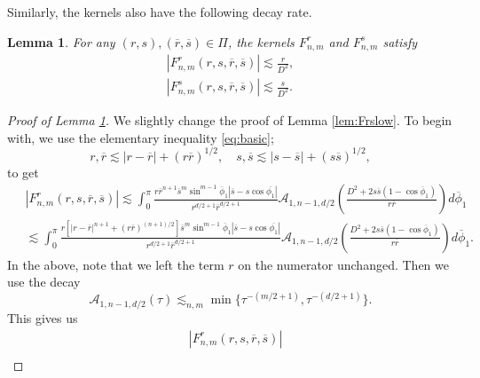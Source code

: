\documentclass[11pt]{amsart}
\newtheorem{lem}[theorem]{Lemma}
\theoremstyle{definition}
\theoremstyle{remark}
\numberwithin{equation}{section}
\numberwithin{equation}{section}
\newcommand{\br}[1]{\overline{#1}}
\newcommand{\0}{\emptyset}
\newcommand{\calA}{\mathcal A}
\begin{document}
	Similarly, the kernels also have the following decay rate.
	\begin{lem}\label{lem:FrFsweight}
		For any $(r,s), (\br{r},\br{s})\in \Pi$, the kernels $F_{n,m}^{r}$ and $F_{n,m}^{s}$ satisfy
		\begin{align}
			|F_{n,m}^{r}(r,s,\br{r},\br{s})|\lesssim \frac{r}{D^{2}},\label{eq:Frweight}\\
			|F_{n,m}^{s}(r,s,\br{r},\br{s})|\lesssim \frac{s}{D^{2}}.\label{eq:Fsweight}
		\end{align}
	\end{lem}
	
	\begin{proof}[Proof of Lemma \ref{lem:FrFsweight}]
		We slightly change the proof of Lemma \ref{lem:Frslow}. To begin with, we use the elementary inequality \eqref{eq:basic};
		\begin{equation}
			r, \br{r}\lesssim |r-\br{r}|+(r\br{r})^{1/2},\quad s, \br{s}\lesssim |s-\br{s}|+(s\br{s})^{1/2},
		\end{equation}
		to get
		\begin{equation}
			\begin{aligned}
				&|F_{n,m}^{r}(r,s,\br{r},\br{s})|\lesssim %
				\int_{0}^{\pi}\frac{r\br{r}^{n+1}\br{s}^{m}\sin^{m-1}\br{\phi}_{1}|\br{s}-s\cos\br{\phi_{1}}|}{r^{d/2+1}\br{r}^{d/2+1}}\calA_{1,n-1,d/2}\left(\frac{D^{2}+2s\br{s}(1-\cos\br{\phi}_{1})}{r\br{r}}\right)d\br{\phi}_{1}\\
				\;&\lesssim %
				\int_{0}^{\pi}\frac{r[|r-\br{r}|^{n+1}+(r\br{r})^{(n+1)/2}]\br{s}^{m}\sin^{m-1}\br{\phi}_{1}|\br{s}-s\cos\br{\phi_{1}}|}{r^{d/2+1}\br{r}^{d/2+1}}\calA_{1,n-1,d/2}\left(\frac{D^{2}+2s\br{s}(1-\cos\br{\phi}_{1})}{r\br{r}}\right)d\br{\phi}_{1}.
			\end{aligned}
		\end{equation}
		In the above, note that we left the term $r$ on the numerator unchanged. Then we use the decay
		\begin{equation}
			\calA_{1,n-1,d/2}(\tau)\lesssim_{n,m} \min\{ \tau^{-(m/2+1)},\tau^{-(d/2+1)}\}.
		\end{equation}
		This gives us
		\begin{equation}
			\begin{aligned}
				&|F_{n,m}^{r}(r,s,\br{r},\br{s})|\\

\end{aligned}
\end{equation}
\end{proof}
\end{document}
